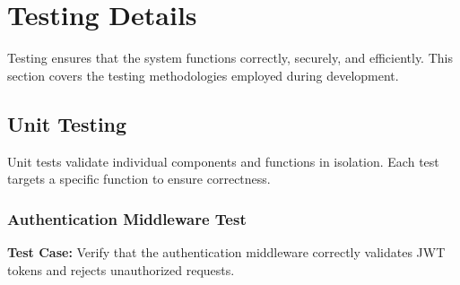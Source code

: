 
\section{Testing Details}

Testing ensures that the system functions correctly, securely, and efficiently. This section covers the testing methodologies employed during development.

\subsection{Unit Testing}

Unit tests validate individual components and functions in isolation. Each test targets a specific function to ensure correctness.

\subsubsection{Authentication Middleware Test}

\textbf{Test Case:} Verify that the authentication middleware correctly validates JWT tokens and rejects unauthorized requests.

